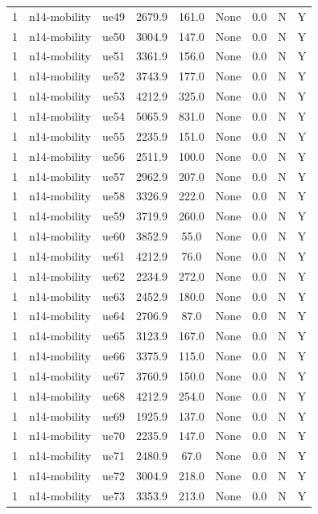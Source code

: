 \begin{table}[ht]
\begin{tabular}{|c|c|c|c|c|c|c|c|c|}
1 & n14-mobility & ue49 & 2679.9 & 161.0 & None & 0.0 & N & Y \\
1 & n14-mobility & ue50 & 3004.9 & 147.0 & None & 0.0 & N & Y \\
1 & n14-mobility & ue51 & 3361.9 & 156.0 & None & 0.0 & N & Y \\
1 & n14-mobility & ue52 & 3743.9 & 177.0 & None & 0.0 & N & Y \\
1 & n14-mobility & ue53 & 4212.9 & 325.0 & None & 0.0 & N & Y \\
1 & n14-mobility & ue54 & 5065.9 & 831.0 & None & 0.0 & N & Y \\
1 & n14-mobility & ue55 & 2235.9 & 151.0 & None & 0.0 & N & Y \\
1 & n14-mobility & ue56 & 2511.9 & 100.0 & None & 0.0 & N & Y \\
1 & n14-mobility & ue57 & 2962.9 & 207.0 & None & 0.0 & N & Y \\
1 & n14-mobility & ue58 & 3326.9 & 222.0 & None & 0.0 & N & Y \\
1 & n14-mobility & ue59 & 3719.9 & 260.0 & None & 0.0 & N & Y \\
1 & n14-mobility & ue60 & 3852.9 & 55.0 & None & 0.0 & N & Y \\
1 & n14-mobility & ue61 & 4212.9 & 76.0 & None & 0.0 & N & Y \\
1 & n14-mobility & ue62 & 2234.9 & 272.0 & None & 0.0 & N & Y \\
1 & n14-mobility & ue63 & 2452.9 & 180.0 & None & 0.0 & N & Y \\
1 & n14-mobility & ue64 & 2706.9 & 87.0 & None & 0.0 & N & Y \\
1 & n14-mobility & ue65 & 3123.9 & 167.0 & None & 0.0 & N & Y \\
1 & n14-mobility & ue66 & 3375.9 & 115.0 & None & 0.0 & N & Y \\
1 & n14-mobility & ue67 & 3760.9 & 150.0 & None & 0.0 & N & Y \\
1 & n14-mobility & ue68 & 4212.9 & 254.0 & None & 0.0 & N & Y \\
1 & n14-mobility & ue69 & 1925.9 & 137.0 & None & 0.0 & N & Y \\
1 & n14-mobility & ue70 & 2235.9 & 147.0 & None & 0.0 & N & Y \\
1 & n14-mobility & ue71 & 2480.9 & 67.0 & None & 0.0 & N & Y \\
1 & n14-mobility & ue72 & 3004.9 & 218.0 & None & 0.0 & N & Y \\
1 & n14-mobility & ue73 & 3353.9 & 213.0 & None & 0.0 & N & Y \\

\end{tabular}
\end{table}
